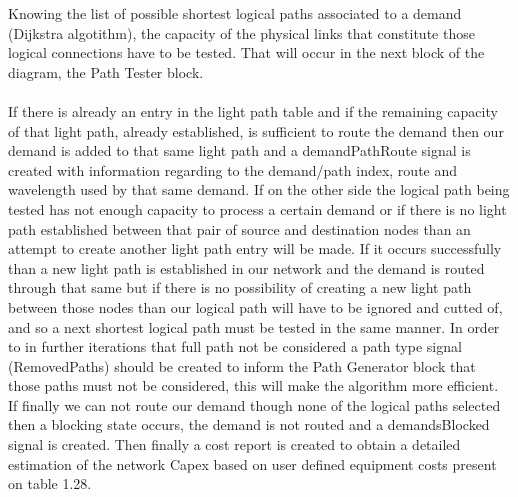 Knowing the list of possible shortest logical paths associated to a demand (Dijkstra algotithm), the capacity of the physical links that constitute those logical connections have to be tested. That will occur in the next block of the diagram, the Path Tester block.\\ \\
If there is already an entry in the light path table and if the remaining capacity of that light path, already established, is sufficient to route the demand then our demand is added to that same light path and a demandPathRoute signal is created with information regarding to the demand/path index, route and wavelength used by that same demand. If on the other side the logical path being tested has not enough capacity to process a certain demand or if there is no light path established between that pair of source and destination nodes than an attempt to create another light path entry will be made. If it occurs successfully than a new light path is established in our network and the demand is routed through that same but if there is no possibility of creating a new light path between those nodes than our logical path will have to be ignored and cutted of, and so a next shortest logical path must be tested in the same manner. In order to in further iterations that full path not be considered a path type signal (RemovedPaths) should be created to inform the Path Generator block that those paths must not be considered, this will make the algorithm more efficient. If finally we can not route our demand though none of the logical paths selected then a blocking state occurs, the demand is not routed and a demandsBlocked signal is created. Then finally a cost report is created to obtain a detailed estimation of the network Capex based on user defined equipment costs present on table 1.28.\\ \\

